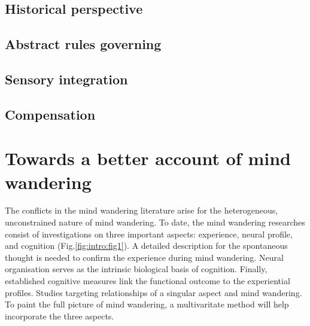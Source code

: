 \subsection{Historical perspective}
\cite{Kanwisher2010}

\cite{Sporns2014}

\cite{Mittner2016}

\cite{SmallwoodFrontiers2013}

\cite{Margulies2016}

\subsection{Abstract rules governing}
\cite{Duncan2010}

\cite{Fox2005}

\cite{Weissman2006}

\subsection{Sensory integration}
\cite{Mesulam1998}

\cite{Villena-Gonzalez2018}

\cite{Murphy2018}


\subsection{Compensation}
\cite{VatanseverPNAS2017}

\cite{Crittenden2015}

\cite{Crittenden2016}

\section{Towards a better account of mind wandering}

The conflicts in the mind wandering literature arise for the heterogeneous, unconstrained nature of mind wandering. To date, the mind wandering researches consist of investigations on three important aspects: experience, neural profile, and cognition (Fig.\ref{fig:intro:fig1}). A detailed description for the spontaneous thought is needed to confirm the experience during mind wandering. Neural organisation serves as the intrinsic biological basis of cognition. Finally, established cognitive measures link the functional outcome to the experiential profiles. Studies targeting relationships of a singular aspect and mind wandering. To paint the full picture of mind wandering, a multivaritate method will help incorporate the three aspects. 

